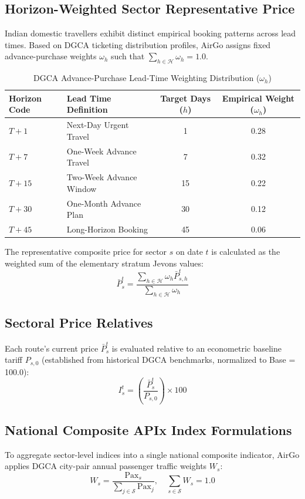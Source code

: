 \documentclass[11pt,a4paper]{article}
\begin{document}
\subsection{Horizon-Weighted Sector Representative Price}
Indian domestic travellers exhibit distinct empirical booking patterns across lead times. Based on DGCA ticketing distribution profiles, AirGo assigns fixed advance-purchase weights $\omega_h$ such that $\sum_{h \in \mathcal{H}} \omega_h = 1.0$.

\begin{table}[htbp]
\centering
\caption{DGCA Advance-Purchase Lead-Time Weighting Distribution ($\omega_h$)}
\label{tab:advance_weights}
\begin{tabular}{llcc}
\toprule
\textbf{Horizon Code} & \textbf{Lead Time Definition} & \textbf{Target Days ($h$)} & \textbf{Empirical Weight ($\omega_h$)} \\
\midrule
$T+1$  & Next-Day Urgent Travel  & 1  & 0.28 \\
$T+7$  & One-Week Advance Travel & 7  & 0.32 \\
$T+15$ & Two-Week Advance Window & 15 & 0.22 \\
$T+30$ & One-Month Advance Plan  & 30 & 0.12 \\
$T+45$ & Long-Horizon Booking    & 45 & 0.06 \\
\bottomrule
\end{tabular}
\end{table}

The representative composite price for sector $s$ on date $t$ is calculated as the weighted sum of the elementary stratum Jevons values:
\begin{equation}
\label{eq:sector_price}
\bar{P}_s^t = \frac{\sum_{h \in \mathcal{H}} \omega_h \bar{P}_{s,h}^t}{\sum_{h \in \mathcal{H}} \omega_h}
\end{equation}

\subsection{Sectoral Price Relatives}
Each route's current price $\bar{P}_s^t$ is evaluated relative to an econometric baseline tariff $P_{s,0}$ (established from historical DGCA benchmarks, normalized to Base = 100.0):
\begin{equation}
I_s^t = \left( \frac{\bar{P}_s^t}{P_{s,0}} \right) \times 100
\end{equation}

\subsection{National Composite APIx Index Formulations}
To aggregate sector-level indices into a single national composite indicator, AirGo applies DGCA city-pair annual passenger traffic weights $W_s$:
\begin{equation}
W_s = \frac{\text{Pax}_s}{\sum_{j \in \mathcal{S}} \text{Pax}_j}, \quad \sum_{s \in \mathcal{S}} W_s = 1.0
\end{equation}
\end{document}
